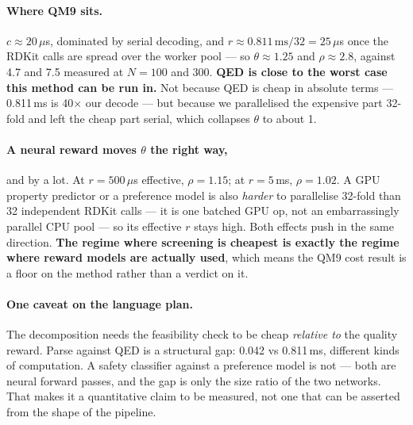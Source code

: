 \documentclass[11pt]{article}
\begin{document}
\paragraph{Where QM9 sits.} $c \approx 20\,\mu$s, dominated by serial decoding,
and $r \approx 0.811\,\mathrm{ms} / 32 = 25\,\mu$s once the RDKit calls are spread
over the worker pool --- so $\theta \approx 1.25$ and $\rho \approx 2.8$, against
4.7 and 7.5 measured at $N = 100$ and $300$. \textbf{QED is close to the worst
case this method can be run in.} Not because QED is cheap in absolute terms
--- 0.811\,ms is 40$\times$ our decode --- but because we parallelised the
expensive part 32-fold and left the cheap part serial, which collapses $\theta$
to about 1.

\paragraph{A neural reward moves $\theta$ the right way,} and by a lot. At
$r = 500\,\mu$s effective, $\rho = 1.15$; at $r = 5\,$ms, $\rho = 1.02$. A GPU
property predictor or a preference model is also \emph{harder} to parallelise
32-fold than 32 independent RDKit calls --- it is one batched GPU op, not an
embarrassingly parallel CPU pool --- so its effective $r$ stays high. Both
effects push in the same direction. \textbf{The regime where screening is
cheapest is exactly the regime where reward models are actually used}, which
means the QM9 cost result is a floor on the method rather than a verdict on it.

\paragraph{One caveat on the language plan.} The decomposition needs the
feasibility check to be cheap \emph{relative to} the quality reward. Parse
against QED is a structural gap: 0.042 vs 0.811\,ms, different kinds of
computation. A safety classifier against a preference model is not --- both are
neural forward passes, and the gap is only the size ratio of the two networks.
That makes it a quantitative claim to be measured, not one that can be asserted
from the shape of the pipeline.
\end{document}
